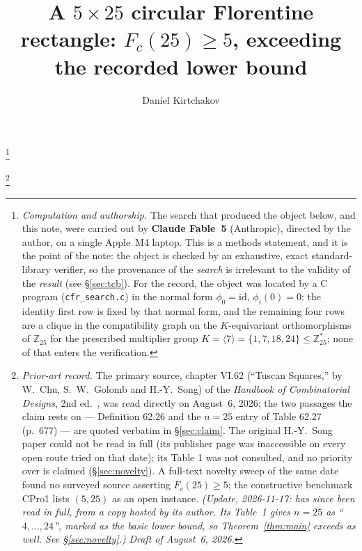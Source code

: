 \documentclass[11pt]{amsart}
\newcommand{\Fc}{F_{c}}
\newcommand{\Zn}{\mathbb{Z}}
\theoremstyle{plain}
\theoremstyle{definition}
\theoremstyle{remark}
\begin{document}
\title[A $5\times 25$ circular Florentine rectangle: $\Fc(25)\ge 5$]{A
$5\times 25$ circular Florentine rectangle: $\Fc(25)\ge 5$, exceeding the
recorded lower bound}

\author{Daniel Kirtchakov}
\address{Independent researcher (\texttt{05oz}); no institutional
affiliation.}

\thanks{\emph{Computation and authorship.} The search that produced the
object below, and this note, were carried out by \textbf{Claude Fable~5}
(Anthropic), directed by the author, on a single Apple~M4 laptop. This is a
methods statement, and it is the point of the note: the object is checked by
an exhaustive, exact standard-library verifier, so the provenance of the
\emph{search} is irrelevant to the validity of the \emph{result} (see
\S\ref{sec:tcb}). For the record, the object was located by a C program
(\texttt{cfr\_search.c}) in the normal form $\phi_0=\mathrm{id}$,
$\phi_i(0)=0$: the identity first row is fixed by that normal form, and the
remaining four rows are a clique in the compatibility graph on the
$K$-equivariant orthomorphisms of $\Zn_{25}$ for the prescribed multiplier
group $K=\langle 7\rangle=\{1,7,18,24\}\le\Zn_{25}^{\ast}$; none of that
enters the verification.}

\thanks{\emph{Prior-art record.} The primary source, chapter VI.62 (``Tuscan
Squares,'' by W.~Chu, S.~W.~Golomb and H.-Y.~Song) of the \emph{Handbook of
Combinatorial Designs}, 2nd ed.\ \cite{HCD}, was read directly on
August~6, 2026; the two passages the claim rests on --- Definition 62.26 and
the $n=25$ entry of Table 62.27 (p.~677) --- are quoted verbatim in
\S\ref{sec:claim}. The original H.-Y.~Song paper \cite{Song00} could not be
read in full (its publisher page was inaccessible on every open route tried on
that date); its Table 1 was not consulted, and no priority over \cite{Song00}
is claimed (\S\ref{sec:novelty}). A full-text novelty sweep of the same date
found no surveyed source asserting $\Fc(25)\ge 5$; the constructive benchmark
CPro1 \cite{CPro1} lists $(5,25)$ as an open instance. \emph{(Update,
2026-11-17: \cite{Song00} has since been read in full, from a copy hosted by
its author. Its Table~1 gives $n=25$ as ``$4,\dots,24$'', marked as the basic
lower bound, so Theorem~\ref{thm:main} exceeds \cite{Song00} as well. See
\S\ref{sec:novelty}.)} \emph{Draft of
August~6, 2026.}}

\end{document}

